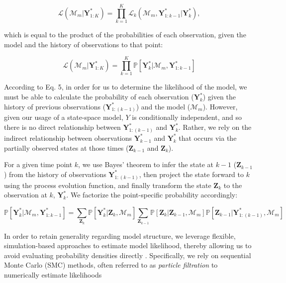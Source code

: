 \documentclass{article}
\begin{document}
\begin{equation}
\mathcal{L}(\mathcal{M}_m|\textbf{Y}^{*}_{1:K}) = \prod_{k = 1}^{K}{\mathcal{L}_k(\mathcal{M}_m, \textbf{Y}^{*}_{1:k-1}|\textbf{Y}^{*}_{k})},
\end{equation}

which is equal to the product of the probabilities of each observation, given the model and the history of observations to that point:

\begin{equation}
\mathcal{L}(\mathcal{M}_m|\textbf{Y}^{*}_{1:K}) = \prod_{k = 1}^{K}{\mathbb{P}[\textbf{Y}^{*}_{k}|\mathcal{M}_m, \textbf{Y}^{*}_{1:k-1}]}
\end{equation}

According to Eq. 5, in order for us to determine the likelihood of the model, we must be able to calculate the probability of each observation ($\textbf{Y}^{*}_{k}$) given the history of previous observations ($\textbf{Y}^{*}_{1:(k-1)}$) and the model ($\mathcal{M}_m$). However, given our usage of a state-space model, $Y$ is conditionally independent, and so there is no direct relationship between $\textbf{Y}^{*}_{1:(k-1)}$ and $\textbf{Y}^{*}_{k}$. Rather, we rely on the indirect relationship between  observations $\textbf{Y}^{*}_{k-1}$ and $\textbf{Y}^{*}_{k}$ that occurs via the partially observed states at those times ($\textbf{Z}_{k-1}$ and $\textbf{Z}_{k}$). 

For a given time point $k$, we use Bayes' theorem  to infer the state at $k-1$ ($\textbf{Z}_{k-1}$) from the history of observations $\textbf{Y}^{*}_{1:(k-1)}$, then project the state forward to $k$ using the process evolution function, and finally transform the state $\textbf{Z}_{k}$ to the observation at $k$, $\textbf{Y}^{*}_{k}$. We factorize the point-specific probability accordingly:

\begin{equation}
\mathbb{P}[\textbf{Y}^{*}_{k}|\mathcal{M}_m, \textbf{Y}^{*}_{1:k-1}] = \sum_{\textbf{Z}_k}{\mathbb{P}[\textbf{Y}^*_k|\textbf{Z}_k, \mathcal{M}_m]}\sum_{\textbf{Z}_{k-1}}{\mathbb{P}[\textbf{Z}_k|\textbf{Z}_{k-1}, \mathcal{M}_m]\mathbb{P}[\textbf{Z}_{k-1}|\textbf{Y}^*_{1:(k-1)}, \mathcal{M}_m]}
\end{equation}

In order to retain generality regarding model structure, we leverage flexible, simulation-based approaches to estimate model likelihood, thereby allowing us to avoid evaluating probability densities directly \citep{Breto2009, He2010, Ionides2015}. Specifically, we rely on sequential Monte Carlo (SMC) methods, often referred to as \emph{particle filtration} to numerically estimate likelihoods \citep{Kitagawa1987, Doucet2001, Ionides2006}
\end{document}
